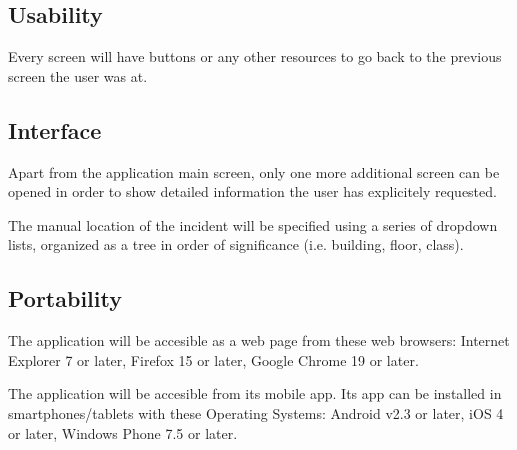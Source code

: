 \subsection{Usability}
\begin{NFrequirement}
Every screen will have buttons or any other resources to go back to the previous screen the user was at.
\end{NFrequirement}

\subsection{Interface}
\begin{NFrequirement}
Apart from the application main screen, only one more additional screen can be opened in order to show detailed information the user has explicitely requested.
\end{NFrequirement}
\begin{NFrequirement}
The manual location of the incident will be specified using a series of dropdown lists, organized as a tree in order of significance (i.e. building, floor, class).
\end{NFrequirement}

\subsection{Portability}
\begin{NFrequirement}
The application will be accesible as a web page from these web browsers: Internet Explorer 7 or later, Firefox 15 or later, Google Chrome 19 or later. 
\end{NFrequirement}
\begin{NFrequirement}
The application will be accesible from its mobile app. Its app can be installed in smartphones/tablets with these Operating Systems: Android v2.3 or later, iOS 4 or later, Windows Phone 7.5 or later.
\end{NFrequirement}





